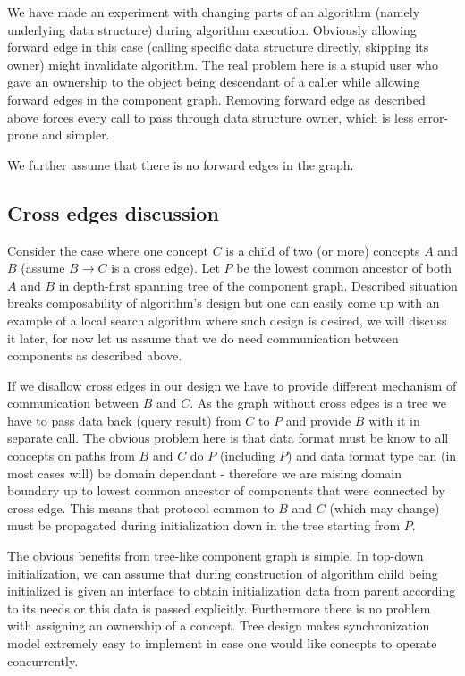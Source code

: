We have made an experiment with changing parts of an algorithm (namely
underlying data structure) during algorithm execution. Obviously allowing
forward edge in this case (calling specific data structure directly, skipping
its owner) might invalidate algorithm. The real problem here is a stupid user
who gave an ownership to the object being descendant of a caller while allowing
forward edges in the component graph. Removing forward edge as described above
forces every call to pass through data structure owner, which is less
error-prone and simpler.

We further assume that there is no forward edges in the graph.

\subsection{Cross edges discussion}
Consider the case where one concept $C$ is a child of two (or more) concepts
$A$ and $B$ (assume $B \to C$ is a cross edge). Let $P$ be the lowest common
ancestor of both $A$ and $B$ in depth-first spanning tree of the component
graph. Described situation breaks composability of algorithm's design but one
can easily come up with an example of a local search algorithm where such
design is desired, we will discuss it later, for now let us assume that we do
need communication between components as described above.

If we disallow cross edges in our design we have to provide different mechanism
of communication between $B$ and $C$. As the graph without cross edges is a
tree we have to pass data back (query result) from $C$ to $P$ and provide $B$
with it in separate call. The obvious problem here is that data format must be
know to all concepts on paths from $B$ and $C$ do $P$ (including $P$) and data
format type can (in most cases will) be domain dependant - therefore we are
raising domain boundary up to lowest common ancestor of components that were
connected by cross edge. This means that protocol common to $B$ and $C$ (which
may change) must be propagated during initialization down in the tree starting
from $P$.

The obvious benefits from tree-like component graph is simple. In top-down
initialization, we can assume that during construction of algorithm child being
initialized is given an interface to obtain initialization data from parent
according to its needs or this data is passed explicitly. Furthermore there is
no problem with assigning an ownership of a concept. Tree design makes
synchronization model extremely easy to implement in case one would like
concepts to operate concurrently.

